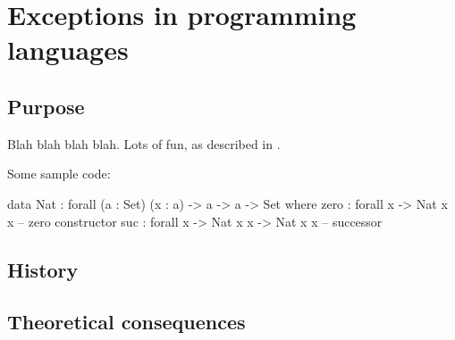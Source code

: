 \chapter{Exceptions in programming languages}

\section{Purpose}

Blah blah blah blah. Lots of fun, as described in \cite{swierstra:thesis}.

Some sample code:
\begin{code}
data Nat : forall (a : Set) (x : a) -> a -> a -> Set where
  zero : forall {x} -> Nat x x  -- zero constructor
  suc : forall {x} -> Nat x x -> Nat x x  -- successor
\end{code}

\section{History}

\section{Theoretical consequences}

